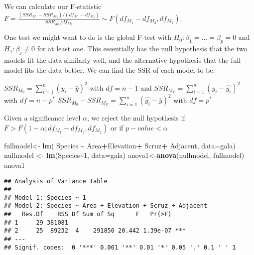 \documentclass[
]{article}
\newenvironment{Shaded}{\begin{snugshade}}{\end{snugshade}}
\newcommand{\AttributeTok}[1]{\textcolor[rgb]{0.13,0.29,0.53}{#1}}
\newcommand{\DecValTok}[1]{\textcolor[rgb]{0.00,0.00,0.81}{#1}}
\newcommand{\FunctionTok}[1]{\textcolor[rgb]{0.13,0.29,0.53}{\textbf{#1}}}
\newcommand{\NormalTok}[1]{#1}
\newcommand{\OtherTok}[1]{\textcolor[rgb]{0.56,0.35,0.01}{#1}}
\newcommand{\SpecialCharTok}[1]{\textcolor[rgb]{0.81,0.36,0.00}{\textbf{#1}}}
\begin{document}
We can calculate our F-statistic
\(F=\frac{(SSR_{M_1}-SSR_{M_2})/(df_{M_1}-df_{M_2})}{SSR_{M_2}/df_{M_2}} \sim F(df_{M_1}-df_{M_2},df_{M_2})\).

One test we might want to do is the global F-test with
\(H_0:\beta_1=...=\beta_p=0\) and \(H_1:\beta_j\neq 0\) for at least
one. This essentially has the null hypothesis that the two models fit
the data similarly well, and the alternative hypothesis that the full
model fits the data better. We can find the SSR of each model to be:

\(SSR_{M_0}=\sum_{i=1}^n(y_i-\bar{y})^2\) with \(df=n-1\) and
\(SSR_{M_F}=\sum_{i=1}^n(y_i-\hat{y_i})^2\) with \(df=n-p^*\)
\(SSR_{M_0}-SSR_{M_F}=\sum_{i=1}^n(\hat{y_i}-\bar{y})^2\) with
\(df=p^*\)

Given a significance level \(\alpha\), we reject the null hypothesis if
\(F\gt F(1-\alpha;df_{M_1}-df_{M_2}, df_{M_2})\) or if
\(p-value\lt \alpha\)

\begin{Shaded}
\begin{Highlighting}[]
\NormalTok{fullmodel}\OtherTok{\textless{}{-}} \FunctionTok{lm}\NormalTok{( Species }\SpecialCharTok{\textasciitilde{}}\NormalTok{ Area}\SpecialCharTok{+}\NormalTok{Elevation}\SpecialCharTok{+}\NormalTok{ Scruz}\SpecialCharTok{+}\NormalTok{ Adjacent, }\AttributeTok{data=}\NormalTok{gala)}
\NormalTok{nullmodel }\OtherTok{\textless{}{-}} \FunctionTok{lm}\NormalTok{(Species}\SpecialCharTok{\textasciitilde{}}\DecValTok{1}\NormalTok{, }\AttributeTok{data=}\NormalTok{gala)}
\NormalTok{anova1}\OtherTok{\textless{}{-}}\FunctionTok{anova}\NormalTok{(nullmodel, fullmodel)}
\NormalTok{anova1}
\end{Highlighting}
\end{Shaded}

\begin{verbatim}
## Analysis of Variance Table
## 
## Model 1: Species ~ 1
## Model 2: Species ~ Area + Elevation + Scruz + Adjacent
##   Res.Df    RSS Df Sum of Sq      F   Pr(>F)    
## 1     29 381081                                 
## 2     25  89232  4    291850 20.442 1.39e-07 ***
## ---
## Signif. codes:  0 '***' 0.001 '**' 0.01 '*' 0.05 '.' 0.1 ' ' 1
\end{verbatim}

\begin{Shaded}
\end{Shaded}
\end{document}
